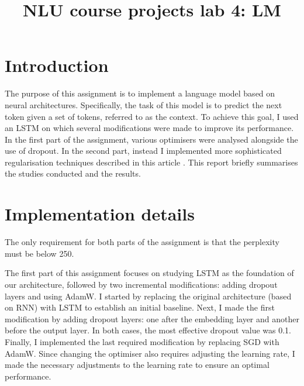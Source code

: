 \documentclass[a4paper]{article}
\title{NLU course projects lab 4: LM}
\begin{document}
\maketitle

\section{Introduction}
The purpose of this assignment is to implement a language model based on neural architectures.
Specifically, the task of this model is to predict the next token given a set of tokens, referred to as the context.
To achieve this goal, I used an LSTM on which several modifications were made to improve its performance. 
In the first part of the assignment, various optimisers were analysed alongside the use of dropout. In the second part, instead I implemented more sophisticated regularisation techniques described in this article \cite{merity2017regularizing}.
This report briefly summarises the studies conducted and the results.

\section{Implementation details}
The only requirement for both parts of the assignment is that the perplexity must be below 250.

The first part of this assignment focuses on studying LSTM as the foundation of our architecture, followed by two incremental modifications: adding dropout layers and using AdamW.
I started by replacing the original architecture (based on RNN) with LSTM to establish an initial baseline.
Next, I made the first modification by adding dropout layers: one after the embedding layer and another before the output layer. In both cases, the most effective dropout value was 0.1.
Finally, I implemented the last required modification by replacing SGD with AdamW. Since changing the optimiser also requires adjusting the learning rate, I made the necessary adjustments to the learning rate to ensure an optimal performance.
\end{document}
